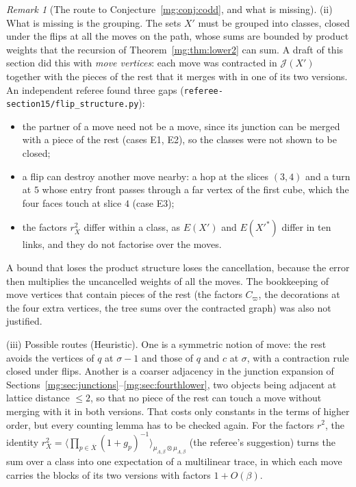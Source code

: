 \documentclass[11pt,a4paper]{article}
\theoremstyle{definition}
\theoremstyle{remark}
\newtheorem{remark}[theorem]{Remark}
\begin{document}
\begin{remark}[The route to Conjecture~\ref{mg:conj:codd}, and what is missing]
(ii) What is missing is the grouping. The sets $X'$ must be grouped into classes, closed under the flips at all the moves on the path, whose sums are bounded by
product weights that the recursion of Theorem~\ref{mg:thm:lower2} can sum. A draft of this section did this with \emph{move vertices}: each move was contracted in
$\mathcal J(X')$ together with the pieces of the rest that it merges with in one of its two versions. An independent referee found three gaps
(\texttt{referee-section15/flip\_structure.py}):
\begin{itemize}
\item the partner of a move need not be a move, since its junction can be merged with a piece of the rest (cases E1, E2), so the classes were not shown to be closed;
\item a flip can destroy another move nearby: a hop at the slices $(3,4)$ and a turn at $5$ whose entry front passes through a far vertex of the first cube, which the
four faces touch at slice $4$ (case E3);
\item the factors $r_X^2$ differ within a class, as $E(X')$ and $E(X'^*)$ differ in ten links, and they do not factorise over the moves.
\end{itemize}
A bound that loses the product structure loses the cancellation, because the error then multiplies the uncancelled weights of all the moves. The bookkeeping of
move vertices that contain pieces of the rest (the factors $C_\varpi$, the decorations at the four extra vertices, the tree sums over the contracted graph) was
also not justified.

(iii) Possible routes (Heuristic). One is a symmetric notion of move: the rest avoids the vertices of $q$ at $\sigma-1$ and those of $q$ and $c$ at $\sigma$, with a
contraction rule closed under flips. Another is a coarser adjacency in the junction expansion of Sections~\ref{mg:sec:junctions}--\ref{mg:sec:fourthlower}, two objects
being adjacent at lattice distance $\le2$, so that no piece of the rest can touch a move without merging with it in both versions. That costs only constants in the
terms of higher order, but every counting lemma has to be checked again. For the factors $r^2$, the identity
$r_X^2=\bigl\langle\prod_{p\in\overline X}(1+g_p)^{-1}\bigr\rangle_{\mu_{\Lambda,\beta}\otimes\mu_{\Lambda,\beta}}$ (the referee's suggestion) turns the sum over a class into one expectation of
a multilinear trace, in which each move carries the blocks of its two versions with factors $1+O(\beta)$.


\end{remark}
\end{document}
